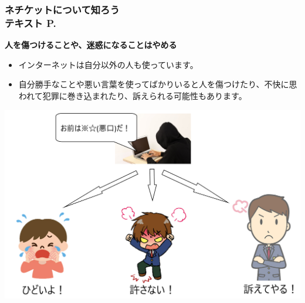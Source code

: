 \begin{frame}[fragile]
    \frametitle{ネチケットについて知ろう\\テキスト P.\pageref{1:P:Netiquette}~~~}
    \textbf{人を傷つけることや、迷惑になることはやめる}
            \begin{itemize}\small
                \item インターネットは自分以外の人も使っています。
                \item 自分勝手なことや悪い言葉を使ってばかりいると人を傷つけたり、不快に思われて犯罪に巻き込まれたり、訴えられる可能性もあります。
            \end{itemize}
            \vfill
            
			\begin{minipage}{0.7\textwidth}
                {\upshape
                  \includegraphics[scale=0.2]{slide07-img/slide07-img004.png}}
            \end{minipage}
\end{frame}

